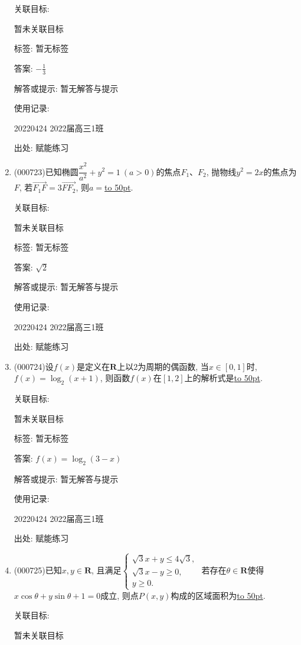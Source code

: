 \documentclass[10pt,a4paper]{article}
\newcommand{\blank}[1]{\underline{\hbox to #1pt{}}}
\begin{document}
\begin{enumerate}[1.]
关联目标:

暂未关联目标



标签: 暂无标签

答案: $-\frac 13$

解答或提示: 暂无解答与提示

使用记录:

20220424	2022届高三1班	


出处: 赋能练习
\item { (000723)}已知椭圆$\dfrac{x^2}{a^2}+y^2=1 \ (a>0)$的焦点$F_1$、$F_2$, 抛物线${y^2}=2x$的焦点为$F$, 若$\overrightarrow{F_1F}=3 \overrightarrow{FF_2}$, 则$a=$\blank{50}.


关联目标:

暂未关联目标



标签: 暂无标签

答案: $\sqrt 2$

解答或提示: 暂无解答与提示

使用记录:

20220424	2022届高三1班	


出处: 赋能练习
\item { (000724)}设$f(x)$是定义在$\mathbf{R}$上以$2$为周期的偶函数, 当$x\in [0,1]$时, $f(x)=\log_2(x+1)$, 则函数$f(x)$在$[1,2]$上的解析式是\blank{50}.


关联目标:

暂未关联目标



标签: 暂无标签

答案: $f(x)=\log_2(3-x)$

解答或提示: 暂无解答与提示

使用记录:

20220424	2022届高三1班	


出处: 赋能练习
\item { (000725)}已知$x,y\in \mathbf{R}$, 且满足$\begin{cases} \sqrt3x+y\le 4 \sqrt3, \\  \sqrt3x-y\ge 0,\\ y\ge 0. \end{cases}$ 若存在$\theta \in \mathbf{R}$使得$x\cos \theta +y\sin \theta +1=0$成立, 则点$P(x,y)$构成的区域面积为\blank{50}.


关联目标:

暂未关联目标




\end{enumerate}
\end{document}
